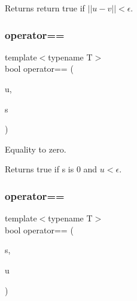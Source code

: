 \begin{DoxyReturn}{Returns}
return true if $ ||u - v|| < \epsilon $. 
\end{DoxyReturn}
\mbox{\label{class_n_vector_aaffc8825c70b5e498690e0882d202a65}} 
\subsubsection{\texorpdfstring{operator==}{operator==}\hspace{0.1cm}{\footnotesize\ttfamily [2/3]}}
{\footnotesize\ttfamily template$<$typename T$>$ \\
bool operator== (\begin{DoxyParamCaption}\item[{const \mbox{\hyperlink{class_n_vector}{N\+Vector}}$<$ T $>$ \&}]{u,  }\item[{T}]{s }\end{DoxyParamCaption})\hspace{0.3cm}{\ttfamily [friend]}}



Equality to zero. 

\begin{DoxyReturn}{Returns}
true if {\ttfamily s} is 0 and $ u \lt \epsilon $. 
\end{DoxyReturn}
\mbox{\label{class_n_vector_a4f2b795f34a0a21dfcc146ba02899a1b}} 
\subsubsection{\texorpdfstring{operator==}{operator==}\hspace{0.1cm}{\footnotesize\ttfamily [3/3]}}
{\footnotesize\ttfamily template$<$typename T$>$ \\
bool operator== (\begin{DoxyParamCaption}\item[{T}]{s,  }\item[{const \mbox{\hyperlink{class_n_vector}{N\+Vector}}$<$ T $>$ \&}]{u }\end{DoxyParamCaption})\hspace{0.3cm}{\ttfamily [friend]}}

